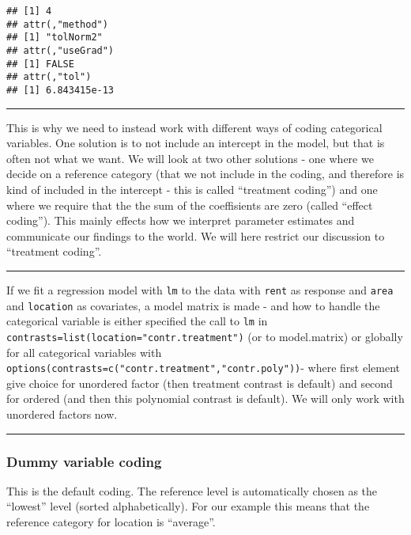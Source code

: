 \documentclass[]{article}
\begin{document}
\begin{verbatim}
## [1] 4
## attr(,"method")
## [1] "tolNorm2"
## attr(,"useGrad")
## [1] FALSE
## attr(,"tol")
## [1] 6.843415e-13
\end{verbatim}

\normalsize

\begin{center}\rule{0.5\linewidth}{\linethickness}\end{center}

This is why we need to instead work with different ways of coding
categorical variables. One solution is to not include an intercept in
the model, but that is often not what we want. We will look at two other
solutions - one where we decide on a reference category (that we not
include in the coding, and therefore is kind of included in the
intercept - this is called ``treatment coding'') and one where we
require that the the sum of the coeffisients are zero (called ``effect
coding''). This mainly effects how we interpret parameter estimates and
communicate our findings to the world. We will here restrict our
discussion to ``treatment coding''.

\begin{center}\rule{0.5\linewidth}{\linethickness}\end{center}

If we fit a regression model with \texttt{lm} to the data with
\texttt{rent} as response and \texttt{area} and \texttt{location} as
covariates, a model matrix is made - and how to handle the categorical
variable is either specified the call to \texttt{lm} in
\texttt{contrasts=list(location="contr.treatment")} (or to model.matrix)
or globally for all categorical variables with
\texttt{options(contrasts=c("contr.treatment","contr.poly"))}- where
first element give choice for unordered factor (then treatment contrast
is default) and second for ordered (and then this polynomial contrast is
default). We will only work with unordered factors now.

\begin{center}\rule{0.5\linewidth}{\linethickness}\end{center}

\hypertarget{dummy-variable-coding}{%
\subsubsection{Dummy variable coding}\label{dummy-variable-coding}}

This is the default coding. The reference level is automatically chosen
as the ``lowest'' level (sorted alphabetically). For our example this
means that the reference category for location is ``average''.
\end{document}
